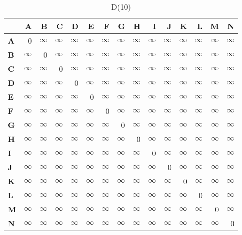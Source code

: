 \documentclass{article}
\newcommand{\INF}{$\infty$}
\begin{document}
\begin{table}[H]\centering
\caption{D(10)}
\begin{tabular}{l r r r r r r r r r r r r r r}
\toprule
 & \textbf{A} & \textbf{B} & \textbf{C} & \textbf{D} & \textbf{E} & \textbf{F} & \textbf{G} & \textbf{H} & \textbf{I} & \textbf{J} & \textbf{K} & \textbf{L} & \textbf{M} & \textbf{N}\\\midrule
\textbf{A} & 0 & \INF & \INF & \INF & \INF & \INF & \INF & \INF & \INF & \INF & \INF & \INF & \INF & \INF \\
\textbf{B} & \INF & 0 & \INF & \INF & \INF & \INF & \INF & \INF & \INF & \INF & \INF & \INF & \INF & \INF \\
\textbf{C} & \INF & \INF & 0 & \INF & \INF & \INF & \INF & \INF & \INF & \INF & \INF & \INF & \INF & \INF \\
\textbf{D} & \INF & \INF & \INF & 0 & \INF & \INF & \INF & \INF & \INF & \INF & \INF & \INF & \INF & \INF \\
\textbf{E} & \INF & \INF & \INF & \INF & 0 & \INF & \INF & \INF & \INF & \INF & \INF & \INF & \INF & \INF \\
\textbf{F} & \INF & \INF & \INF & \INF & \INF & 0 & \INF & \INF & \INF & \INF & \INF & \INF & \INF & \INF \\
\textbf{G} & \INF & \INF & \INF & \INF & \INF & \INF & 0 & \INF & \INF & \INF & \INF & \INF & \INF & \INF \\
\textbf{H} & \INF & \INF & \INF & \INF & \INF & \INF & \INF & 0 & \INF & \INF & \INF & \INF & \INF & \INF \\
\textbf{I} & \INF & \INF & \INF & \INF & \INF & \INF & \INF & \INF & 0 & \INF & \INF & \INF & \INF & \INF \\
\textbf{J} & \INF & \INF & \INF & \INF & \INF & \INF & \INF & \INF & \INF & 0 & \INF & \INF & \INF & \INF \\
\textbf{K} & \INF & \INF & \INF & \INF & \INF & \INF & \INF & \INF & \INF & \INF & 0 & \INF & \INF & \INF \\
\textbf{L} & \INF & \INF & \INF & \INF & \INF & \INF & \INF & \INF & \INF & \INF & \INF & 0 & \INF & \INF \\
\textbf{M} & \INF & \INF & \INF & \INF & \INF & \INF & \INF & \INF & \INF & \INF & \INF & \INF & 0 & \INF \\
\textbf{N} & \INF & \INF & \INF & \INF & \INF & \INF & \INF & \INF & \INF & \INF & \INF & \INF & \INF & 0 \\
\bottomrule
\end{tabular}
\end{table}
\end{document}
